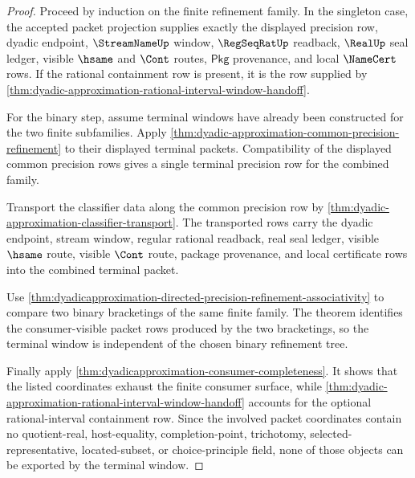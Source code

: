 \begin{proof}
Proceed by induction on the finite refinement family. In the singleton case,
the accepted packet projection supplies exactly the displayed precision row,
dyadic endpoint, $\StreamNameUp$ window, $\RegSeqRatUp$ readback, $\RealUp$
seal ledger, visible $\hsame$ and $\Cont$ routes, $\mathsf{Pkg}$ provenance,
and local $\NameCert$ rows. If the rational containment row is present, it is
the row supplied by
\autoref{thm:dyadic-approximation-rational-interval-window-handoff}.

For the binary step, assume terminal windows have already been constructed for
the two finite subfamilies. Apply
\autoref{thm:dyadic-approximation-common-precision-refinement} to their
displayed terminal packets. Compatibility of the displayed common precision
rows gives a single terminal precision row for the combined family.

Transport the classifier data along the common precision row by
\autoref{thm:dyadic-approximation-classifier-transport}. The transported rows
carry the dyadic endpoint, stream window, regular rational readback, real seal
ledger, visible $\hsame$ route, visible $\Cont$ route, package provenance, and
local certificate rows into the combined terminal packet.

Use
\autoref{thm:dyadicapproximation-directed-precision-refinement-associativity}
to compare two binary bracketings of the same finite family. The theorem
identifies the consumer-visible packet rows produced by the two bracketings, so
the terminal window is independent of the chosen binary refinement tree.

Finally apply \autoref{thm:dyadicapproximation-consumer-completeness}. It
shows that the listed coordinates exhaust the finite consumer surface, while
\autoref{thm:dyadic-approximation-rational-interval-window-handoff} accounts
for the optional rational-interval containment row. Since the involved packet
coordinates contain no quotient-real, host-equality, completion-point,
trichotomy, selected-representative, located-subset, or choice-principle field,
none of those objects can be exported by the terminal window.
\end{proof}
